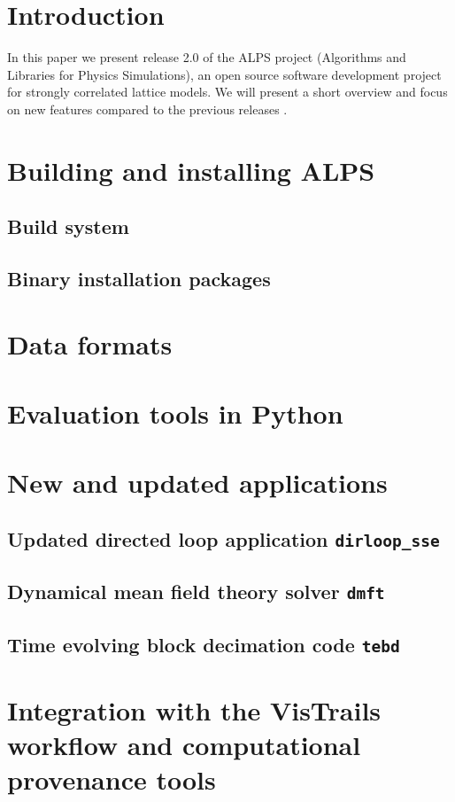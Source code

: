 \documentclass[12pt]{iopart}
\begin{document}
\section{Introduction}
\label{}

In this paper we present release 2.0 of the ALPS project  (Algorithms and Libraries for Physics Simulations), an open source software development project for strongly correlated lattice models. We will present a short overview  and focus on new features compared to the previous releases \cite{ALPS1.2,ALPS1.3}.

\section{Building and installing ALPS}
\subsection{Build system}
\subsection{Binary installation packages}
\section{Data formats}
\section{Evaluation tools in Python}
\section{New and updated applications}
\subsection{Updated directed loop application {\tt dirloop\_sse}}
\subsection{Dynamical mean field theory solver {\tt dmft}}
\subsection{Time evolving block decimation code {\tt tebd}}

\section{Integration with the VisTrails workflow and computational provenance tools}
\end{document}
